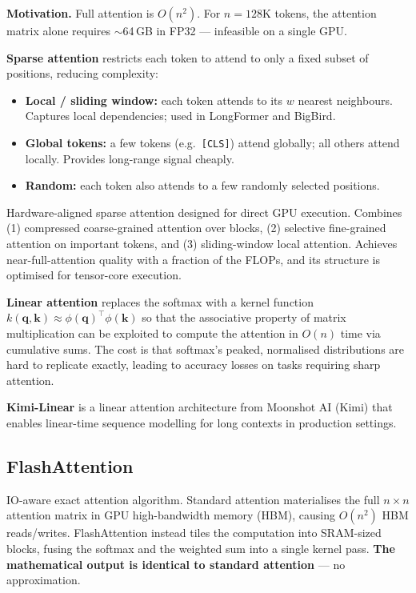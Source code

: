 \textbf{Motivation.} Full attention is $O(n^2)$. For $n = 128$K tokens, the attention
matrix alone requires $\sim$64\,GB in FP32 --- infeasible on a single GPU.

\textbf{Sparse attention} restricts each token to attend to only a fixed subset of
positions, reducing complexity:
\begin{itemize}
  \item \textbf{Local / sliding window:} each token attends to its $w$ nearest
    neighbours. Captures local dependencies; used in LongFormer and BigBird.
  \item \textbf{Global tokens:} a few tokens (e.g.\ \texttt{[CLS]}) attend globally;
    all others attend locally. Provides long-range signal cheaply.
  \item \textbf{Random:} each token also attends to a few randomly selected positions.
\end{itemize}

\begin{paperbox}[title={Native Sparse Attention (NSA, DeepSeek, 2025)}]
  Hardware-aligned sparse attention designed for direct GPU execution. Combines
  (1) compressed coarse-grained attention over blocks, (2) selective fine-grained
  attention on important tokens, and (3) sliding-window local attention.
  Achieves near-full-attention quality with a fraction of the FLOPs, and its
  structure is optimised for tensor-core execution.
\end{paperbox}

\textbf{Linear attention} replaces the softmax with a kernel function
$k(\mathbf{q}, \mathbf{k}) \approx \phi(\mathbf{q})^\top \phi(\mathbf{k})$ so that the
associative property of matrix multiplication can be exploited to compute the attention
in $O(n)$ time via cumulative sums. The cost is that softmax's peaked, normalised
distributions are hard to replicate exactly, leading to accuracy losses on tasks
requiring sharp attention.

\textbf{Kimi-Linear} is a linear attention architecture from Moonshot AI (Kimi) that
enables linear-time sequence modelling for long contexts in production settings.

\subsection{Flash\-Attention}

\begin{paperbox}[title={FlashAttention (Dao et al.\ 2022)}]
  IO-aware exact attention algorithm. Standard attention materialises the full
  $n \times n$ attention matrix in GPU high-bandwidth memory (HBM), causing $O(n^2)$
  HBM reads/writes. FlashAttention instead tiles the computation into SRAM-sized blocks,
  fusing the softmax and the weighted sum into a single kernel pass.
  \textbf{The mathematical output is identical to standard attention} --- no approximation.
\end{paperbox}

